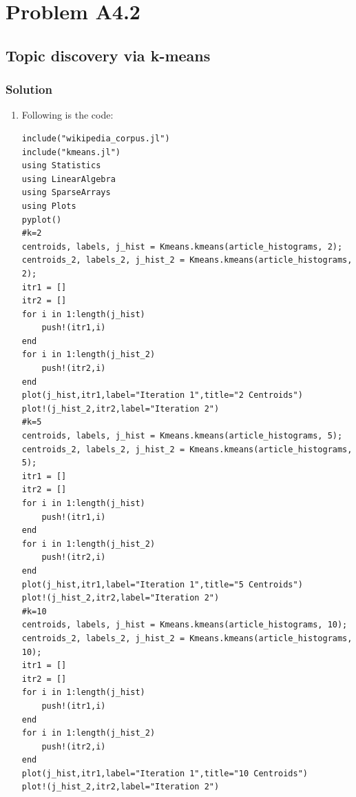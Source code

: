 \documentclass{article}
\begin{document}
\section*{Problem A4.2}
\subsection*{Topic discovery via k-means}
\subsubsection*{Solution}
\begin{enumerate}[label=(\alph*)]
    \item Following is the code:
\begin{verbatim}
include("wikipedia_corpus.jl")
include("kmeans.jl")
using Statistics
using LinearAlgebra
using SparseArrays
using Plots
pyplot()
#k=2
centroids, labels, j_hist = Kmeans.kmeans(article_histograms, 2);
centroids_2, labels_2, j_hist_2 = Kmeans.kmeans(article_histograms, 2);
itr1 = []
itr2 = []
for i in 1:length(j_hist)
    push!(itr1,i) 
end
for i in 1:length(j_hist_2)
    push!(itr2,i) 
end
plot(j_hist,itr1,label="Iteration 1",title="2 Centroids")
plot!(j_hist_2,itr2,label="Iteration 2")
#k=5
centroids, labels, j_hist = Kmeans.kmeans(article_histograms, 5);
centroids_2, labels_2, j_hist_2 = Kmeans.kmeans(article_histograms, 5);
itr1 = []
itr2 = []
for i in 1:length(j_hist)
    push!(itr1,i) 
end
for i in 1:length(j_hist_2)
    push!(itr2,i) 
end
plot(j_hist,itr1,label="Iteration 1",title="5 Centroids")
plot!(j_hist_2,itr2,label="Iteration 2")
#k=10
centroids, labels, j_hist = Kmeans.kmeans(article_histograms, 10);
centroids_2, labels_2, j_hist_2 = Kmeans.kmeans(article_histograms, 10);
itr1 = []
itr2 = []
for i in 1:length(j_hist)
    push!(itr1,i) 
end
for i in 1:length(j_hist_2)
    push!(itr2,i) 
end
plot(j_hist,itr1,label="Iteration 1",title="10 Centroids")
plot!(j_hist_2,itr2,label="Iteration 2")
\end{verbatim}
\begin{figure}[htp]


\end{figure}
\end{enumerate}
\end{document}
